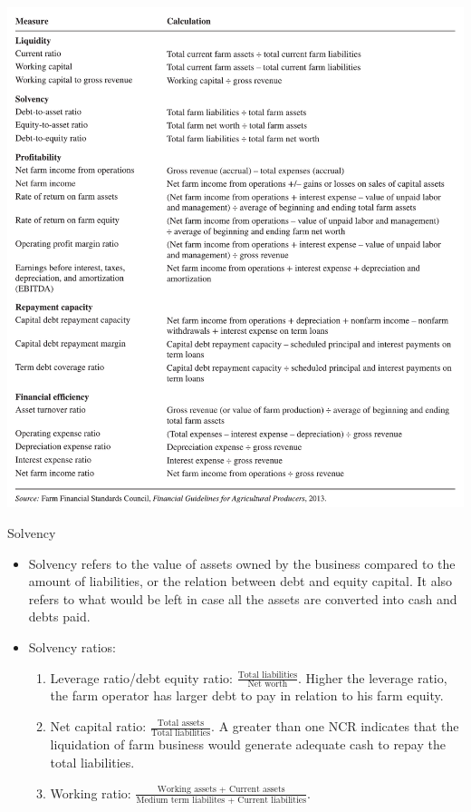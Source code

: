 \documentclass[12pt,ignorenonframetext,aspectratio=169]{beamer}
\providecommand{\tightlist}{%
  \setlength{\itemsep}{0pt}\setlength{\parskip}{0pt}}
\begin{document}
\begin{frame}{}
\protect\hypertarget{section-6}{}
\begin{center}\includegraphics[width=0.5\linewidth]{./figs/farm_financial_ratios} \end{center}
\end{frame}

\begin{frame}{Solvency}
\protect\hypertarget{solvency}{}
\begin{itemize}
\tightlist
\item
  Solvency refers to the value of assets owned by the business compared
  to the amount of liabilities, or the relation between debt and equity
  capital. It also refers to what would be left in case all the assets
  are converted into cash and debts paid.
\item
  Solvency ratios:

  \begin{enumerate}
  \tightlist
  \item
    Leverage ratio/debt equity ratio:
    \(\frac{\textrm{Total liabilities}}{\textrm{Net worth}}\). Higher
    the leverage ratio, the farm operator has larger debt to pay in
    relation to his farm equity.
  \item
    Net capital ratio:
    \(\frac{\textrm{Total assets}}{\textrm{Total liabilities}}\). A
    greater than one NCR indicates that the liquidation of farm business
    would generate adequate cash to repay the total liabilities.
  \item
    Working ratio:
    \(\frac{\textrm{Working assets + Current assets}}{\textrm{Medium term liabilites + Current liabilities}}\).
  \end{enumerate}
\end{itemize}
\end{frame}
\end{document}
